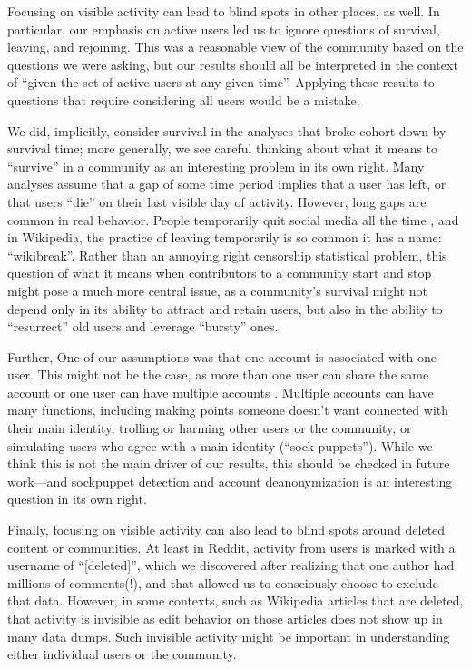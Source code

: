 Focusing on visible activity can lead to blind spots in other places, as well.  In particular, our emphasis on active users led us to ignore questions of survival, leaving, and rejoining.  This was a reasonable view of the community based on the questions we were asking, but our results should all be interpreted in the context of ``given the set of active users at any given time''.  Applying these results to questions that require considering all users would be a mistake.  

We did, implicitly, consider survival in the analyses that broke cohort down by survival time; more generally, we see careful thinking about what it means to ``survive'' in a community as an interesting problem in its own right.  Many analyses assume that a gap of some time period implies that a user has left, or that users ``die'' on their last visible day of activity.  However, long gaps are common in real behavior.  People temporarily quit social media all the time \cite{Baumer2013}, and in Wikipedia, the practice of leaving temporarily is so common it has a name: ``wikibreak''.    Rather than an annoying right censorship statistical problem, this question of what it means when contributors to a community start and stop might pose a much more central issue, as a community's survival might not depend only in its ability to attract and retain users, but also in the ability to ``resurrect'' old users and leverage ``bursty'' ones.

Further, One of our assumptions was that one account is associated with one user. This might not be the case, as more than one user can share the same account \cite{Lampinen2014} or one user can have multiple accounts \cite{Bergstrom2011}.  Multiple accounts can have many functions, including making points someone doesn't want connected with their main identity, trolling or harming other users or the community, or simulating users who agree with a main identity (``sock puppets'').  While we think this is not the main driver of our results, this should be checked in future work---and sockpuppet detection and account deanonymization is an interesting question in its own right.

Finally, focusing on visible activity can also lead to blind spots around deleted content or communities.  At least in Reddit, activity from users is marked with a username of ``[deleted]'', which we discovered after realizing that one author had millions of comments(!), and that allowed us to consciously choose to exclude that data.  However, in some contexts, such as Wikipedia articles that are deleted, that activity is invisible as edit behavior on those articles does not show up in many data dumps.  Such invisible activity might be important in understanding either individual users or the community. 

